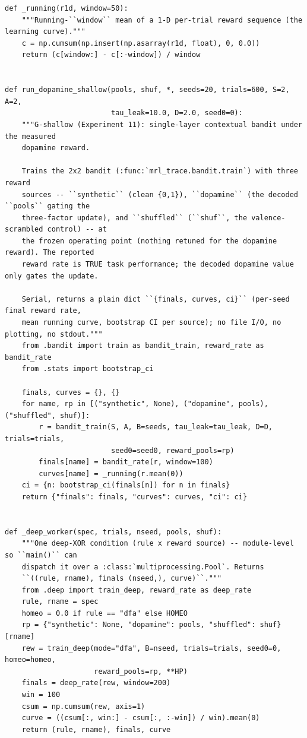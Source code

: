 \begin{lstlisting}[caption={mrl\_trace/dopamine.py},label={lst:siox-src-dopamine}]
def _running(r1d, window=50):
    """Running-``window`` mean of a 1-D per-trial reward sequence (the learning curve)."""
    c = np.cumsum(np.insert(np.asarray(r1d, float), 0, 0.0))
    return (c[window:] - c[:-window]) / window


def run_dopamine_shallow(pools, shuf, *, seeds=20, trials=600, S=2, A=2,
                         tau_leak=10.0, D=2.0, seed0=0):
    """G-shallow (Experiment 11): single-layer contextual bandit under the measured
    dopamine reward.

    Trains the 2x2 bandit (:func:`mrl_trace.bandit.train`) with three reward
    sources -- ``synthetic`` (clean {0,1}), ``dopamine`` (the decoded ``pools`` gating the
    three-factor update), and ``shuffled`` (``shuf``, the valence-scrambled control) -- at
    the frozen operating point (nothing retuned for the dopamine reward). The reported
    reward rate is TRUE task performance; the decoded dopamine value only gates the update.

    Serial, returns a plain dict ``{finals, curves, ci}`` (per-seed final reward rate,
    mean running curve, bootstrap CI per source); no file I/O, no plotting, no stdout."""
    from .bandit import train as bandit_train, reward_rate as bandit_rate
    from .stats import bootstrap_ci

    finals, curves = {}, {}
    for name, rp in [("synthetic", None), ("dopamine", pools), ("shuffled", shuf)]:
        r = bandit_train(S, A, B=seeds, tau_leak=tau_leak, D=D, trials=trials,
                         seed0=seed0, reward_pools=rp)
        finals[name] = bandit_rate(r, window=100)
        curves[name] = _running(r.mean(0))
    ci = {n: bootstrap_ci(finals[n]) for n in finals}
    return {"finals": finals, "curves": curves, "ci": ci}


def _deep_worker(spec, trials, nseed, pools, shuf):
    """One deep-XOR condition (rule x reward source) -- module-level so ``main()`` can
    dispatch it over a :class:`multiprocessing.Pool`. Returns
    ``((rule, rname), finals (nseed,), curve)``."""
    from .deep import train_deep, reward_rate as deep_rate
    rule, rname = spec
    homeo = 0.0 if rule == "dfa" else HOMEO
    rp = {"synthetic": None, "dopamine": pools, "shuffled": shuf}[rname]
    rew = train_deep(mode="dfa", B=nseed, trials=trials, seed0=0, homeo=homeo,
                     reward_pools=rp, **HP)
    finals = deep_rate(rew, window=200)
    win = 100
    csum = np.cumsum(rew, axis=1)
    curve = ((csum[:, win:] - csum[:, :-win]) / win).mean(0)
    return (rule, rname), finals, curve



\end{lstlisting}

